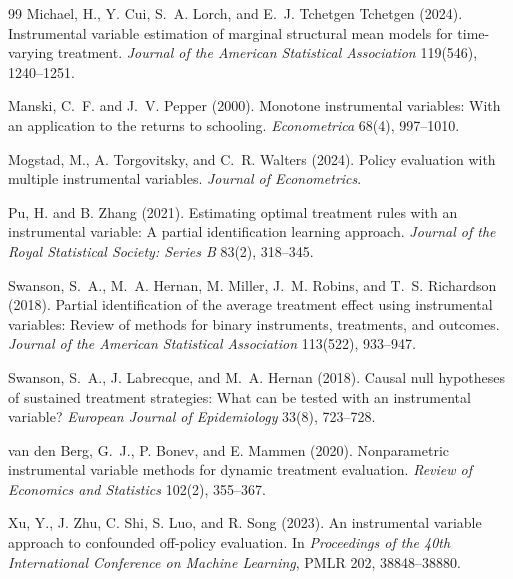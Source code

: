\documentclass[11pt]{article}
\theoremstyle{definition}
\theoremstyle{plain}
\theoremstyle{remark}
\begin{document}
\begin{thebibliography}{99}
Michael, H., Y. Cui, S.~A. Lorch, and E.~J. Tchetgen Tchetgen (2024).
\newblock Instrumental variable estimation of marginal structural mean models for time-varying treatment.
\newblock \emph{Journal of the American Statistical Association} 119(546), 1240--1251.

Manski, C.~F. and J.~V. Pepper (2000).
\newblock Monotone instrumental variables: With an application to the returns to schooling.
\newblock \emph{Econometrica} 68(4), 997--1010.

Mogstad, M., A. Torgovitsky, and C.~R. Walters (2024).
\newblock Policy evaluation with multiple instrumental variables.
\newblock \emph{Journal of Econometrics}.

Pu, H. and B. Zhang (2021).
\newblock Estimating optimal treatment rules with an instrumental variable: A partial identification learning approach.
\newblock \emph{Journal of the Royal Statistical Society: Series B} 83(2), 318--345.

Swanson, S.~A., M.~A. Hernan, M. Miller, J.~M. Robins, and T.~S. Richardson (2018).
\newblock Partial identification of the average treatment effect using instrumental variables: Review of methods for binary instruments, treatments, and outcomes.
\newblock \emph{Journal of the American Statistical Association} 113(522), 933--947.

Swanson, S.~A., J. Labrecque, and M.~A. Hernan (2018).
\newblock Causal null hypotheses of sustained treatment strategies: What can be tested with an instrumental variable?
\newblock \emph{European Journal of Epidemiology} 33(8), 723--728.

van den Berg, G.~J., P. Bonev, and E. Mammen (2020).
\newblock Nonparametric instrumental variable methods for dynamic treatment evaluation.
\newblock \emph{Review of Economics and Statistics} 102(2), 355--367.

Xu, Y., J. Zhu, C. Shi, S. Luo, and R. Song (2023).
\newblock An instrumental variable approach to confounded off-policy evaluation.
\newblock In \emph{Proceedings of the 40th International Conference on Machine Learning}, PMLR 202, 38848--38880.

\end{thebibliography}
\end{document}
